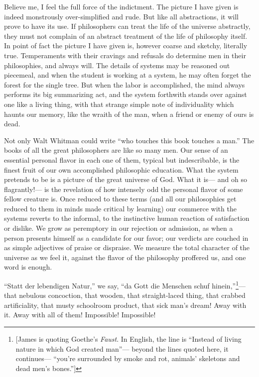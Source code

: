 \documentclass[]{article}
\begin{document}
Believe me, I feel the full force of the indictment. The picture I
have given is indeed monstrously over-simplified and rude. But like all
abstractions, it will prove to have its use. If philosophers can treat
the life of the universe abstractly, they must not complain of an
abstract treatment of the life of philosophy itself. In point of fact
the picture I have given is, however coarse and sketchy, literally true.
Temperaments with their cravings and refusals do determine men in their
philosophies, and always will. The details of systems may be reasoned
out piecemeal, and when the student is working at a system, he may
often forget the forest for the single tree. But when the labor is
accomplished, the mind always performs its big summarizing act, and the
system forthwith stands over against one like a living thing, with that
strange simple note of individuality which haunts our memory, like the
wraith of the man, when a friend or enemy of ours is dead.

Not only Walt Whitman could write ``who touches this book touches a man.''
The books of all the great philosophers are like so many men. Our
sense of an essential personal flavor in each one of them, typical but
indescribable, is the finest fruit of our own accomplished philosophic
education. What the system pretends to be is a picture of the great
universe of God. What it is--- and oh so flagrantly!--- is the revelation of
how intensely odd the personal flavor of some fellow creature is. Once
reduced to these terms (and all our philosophies get reduced to them in
minds made critical by learning) our commerce with the systems reverts
to the informal, to the instinctive human reaction of satisfaction or
dislike. We grow as peremptory in our rejection or admission, as when a
person presents himself as a candidate for our favor; our verdicts are
couched in as simple adjectives of praise or dispraise. We measure the
total character of the universe as we feel it, against the flavor of the
philosophy proffered us, and one word is enough.

``Statt der lebendigen Natur,'' we say, ``da Gott die Menschen schuf
hinein,''\footnote{[James is quoting Goethe's \emph{Faust}. In English, the line is ``Instead of living nature in which God created man''--- beyond the lines quoted here, it continues--- ``you're surrounded by smoke and rot, animals' skeletons and dead men's bones.'']}--- that nebulous concoction, that wooden, that straight-laced
thing, that crabbed artificiality, that musty schoolroom product, that
sick man's dream! Away with it. Away with all of them! Impossible!
Impossible!
\end{document}
